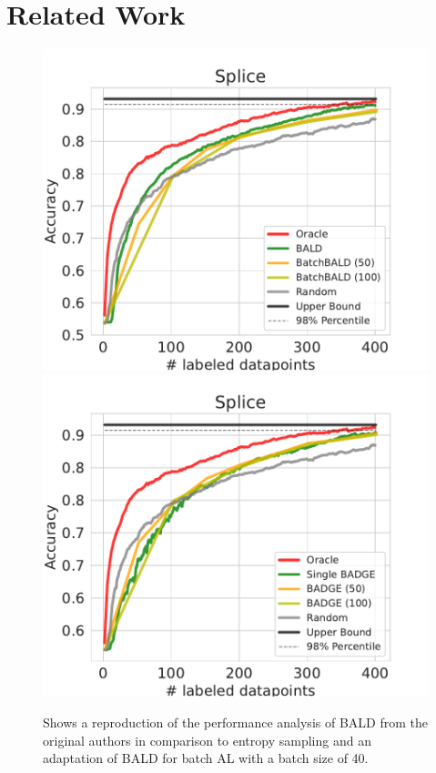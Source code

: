 \documentclass[]{article}
\begin{document}
\section{Related Work}
\begin{figure}
	\centering
	\includegraphics[width=0.49\linewidth]{img/ablation_splice_bald}
	\includegraphics[width=0.49\linewidth]{img/ablation_splice_badge}
	\caption{Shows a reproduction of the performance analysis of BALD from the original authors \cite{gal2017deep} in comparison to entropy sampling and an adaptation of BALD for batch AL \cite{kirsch2019batchbald} with a batch size of 40.}
	\label{fig:ablation_bald}
\end{figure}
\end{document}
